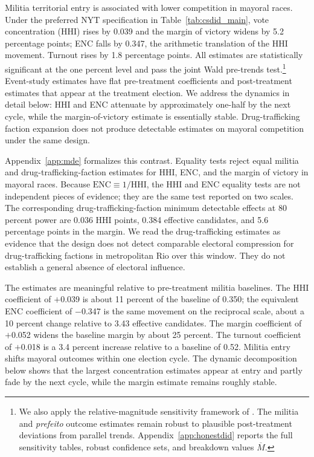 \documentclass[11pt]{article}
\begin{document}
Militia territorial entry is associated with lower competition in mayoral races. Under the preferred NYT specification in Table~\ref{tab:csdid_main}, vote concentration (HHI) rises by 0.039 and the margin of victory widens by 5.2 percentage points; ENC falls by 0.347, the arithmetic translation of the HHI movement. Turnout rises by 1.8 percentage points. All estimates are statistically significant at the one percent level and pass the joint Wald pre-trends test.\footnote{We also apply the relative-magnitude sensitivity framework of \citet{rambachan2023honest}. The militia and \emph{prefeito} outcome estimates remain robust to plausible post-treatment deviations from parallel trends. Appendix~\ref{app:honestdid} reports the full sensitivity tables, robust confidence sets, and breakdown values $\overline{M}$.} Event-study estimates have flat pre-treatment coefficients and post-treatment estimates that appear at the treatment election. We address the dynamics in detail below: HHI and ENC attenuate by approximately one-half by the next cycle, while the margin-of-victory estimate is essentially stable. Drug-trafficking faction expansion does not produce detectable estimates on mayoral competition under the same design.

Appendix~\ref{app:mde} formalizes this contrast. Equality tests reject equal militia and drug-trafficking-faction estimates for HHI, ENC, and the margin of victory in mayoral races. Because $\text{ENC}\equiv 1/\text{HHI}$, the HHI and ENC equality tests are not independent pieces of evidence; they are the same test reported on two scales. The corresponding drug-trafficking-faction minimum detectable effects at 80 percent power are 0.036 HHI points, 0.384 effective candidates, and 5.6 percentage points in the margin. We read the drug-trafficking estimates as evidence that the design does not detect comparable electoral compression for drug-trafficking factions in metropolitan Rio over this window. They do not establish a general absence of electoral influence.

The estimates are meaningful relative to pre-treatment militia baselines. The HHI coefficient of $+$0.039 is about 11 percent of the baseline of 0.350; the equivalent ENC coefficient of $-$0.347 is the same movement on the reciprocal scale, about a 10 percent change relative to 3.43 effective candidates. The margin coefficient of $+$0.052 widens the baseline margin by about 25 percent. The turnout coefficient of $+$0.018 is a 3.4 percent increase relative to a baseline of 0.52. Militia entry shifts mayoral outcomes within one election cycle. The dynamic decomposition below shows that the largest concentration estimates appear at entry and partly fade by the next cycle, while the margin estimate remains roughly stable.
\end{document}
